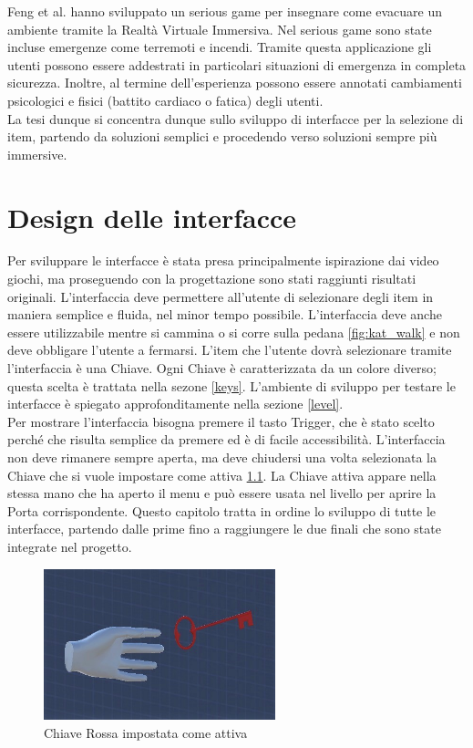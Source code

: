 \documentclass[target=bach,aauheader=]{thud}
\begin{document}
Feng et al. \cite{Feng} hanno sviluppato un serious game per insegnare come evacuare un ambiente tramite la Realtà Virtuale Immersiva.
Nel serious game sono state incluse emergenze come terremoti e incendi. 
Tramite questa applicazione gli utenti possono essere addestrati in particolari situazioni di emergenza in completa sicurezza.
Inoltre, al termine dell'esperienza possono essere annotati cambiamenti psicologici e fisici (battito cardiaco o fatica) degli utenti. \\

La tesi dunque si concentra dunque sullo sviluppo di interfacce per la selezione di item, partendo da soluzioni semplici e procedendo verso soluzioni sempre più immersive. 

\chapter{Design delle interfacce} %
\label{design}

Per sviluppare le interfacce è stata presa principalmente ispirazione dai video giochi, ma proseguendo con la progettazione sono stati raggiunti risultati originali. 
L'interfaccia deve permettere all'utente di selezionare degli item in maniera semplice e fluida, nel minor tempo possibile.
L'interfaccia deve anche essere utilizzabile mentre si cammina o si corre sulla pedana \ref{fig:kat_walk} e non deve obbligare l'utente a fermarsi.
L'item che l'utente dovrà selezionare tramite l'interfaccia è una Chiave.
Ogni Chiave è caratterizzata da un colore diverso; questa scelta è trattata nella sezone \ref{keys}.
L'ambiente di sviluppo per testare le interfacce è spiegato approfonditamente nella sezione \ref{level}. \\

Per mostrare l'interfaccia bisogna premere il tasto Trigger, che è stato scelto perché che risulta semplice da premere ed è di facile accessibilità.  
L'interfaccia non deve rimanere sempre aperta, ma deve chiudersi una volta selezionata la Chiave che si vuole impostare come attiva \ref{fig:key_red}.
La Chiave attiva appare nella stessa mano che ha aperto il menu e può essere usata nel livello per aprire la Porta corrispondente.
Questo capitolo tratta in ordine lo sviluppo di tutte le interfacce, partendo dalle prime fino a raggiungere le due finali che sono state integrate nel progetto.

\begin{figure}[h]
    \centering
    \includegraphics[width=0.60\textwidth]{key_red}
    \caption{Chiave Rossa impostata come attiva}
    \label{fig:key_red}
\end{figure}
\end{document}
